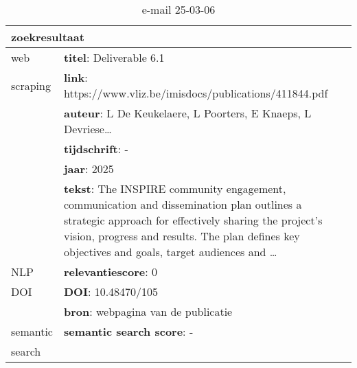 \begin{table}[h!]
    \caption{e-mail 25-03-06}
    \centering
    \begin{tabularx}{\textwidth}{|p{4cm}|X|} 
        \hline
        \multicolumn{2}{|X|}{\textbf{zoekresultaat}} \\
        \hline
        web &\textbf{titel}: Deliverable 6.1\\
        scraping&\textbf{link}: https://www.vliz.be/imisdocs/publications/411844.pdf\\
        &\textbf{auteur}: L De Keukelaere, L Poorters, E Knaeps, L Devriese…\\
        &\textbf{tijdschrift}: -\\
        &\textbf{jaar}: 2025\\
        &\textbf{tekst}: The INSPIRE community engagement, communication and dissemination plan outlines a strategic approach for effectively sharing the project’s vision, progress and results. The plan defines key objectives and goals, target audiences and …\\
        \hline
        NLP&\textbf{relevantiescore}: 0\\
        \hline
        DOI&\textbf{DOI}: 10.48470/105\\
        &\textbf{bron}: webpagina van de publicatie\\
        \hline
        semantic&\textbf{semantic search score}: -\\
        search&\\
        \hline
    \end{tabularx}
    \label{table:email20250306}
\end{table}
